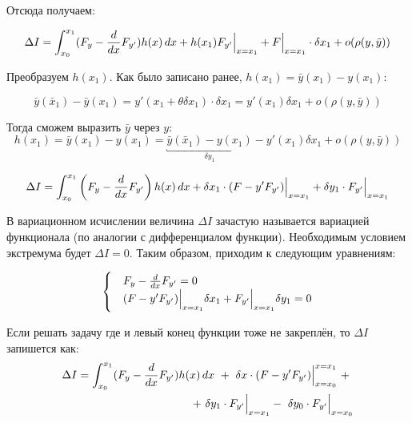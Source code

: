 \documentclass[12pt]{article}
\begin{document}

			Отсюда получаем:

			$$\Delta I = \int_{x_0}^{x_1} (F_y - \frac{d}{dx} F_{y'})h(x)\,dx + h(x_1)F_{y'}\Big|_{x=x_1}^{} + 
	  		F\Big|_{x=x_1}^{}\cdot \delta x_1 + o(\rho(y,\tilde{y}))$$

			Преобразуем $h(x_1)$. Как было записано ранее, $h(x_1) = \bar{y}(x_1) - y(x_1)$:

			$$\bar{y}(\bar{x}_1) - \bar{y}(x_1) = y'(x_1 + \theta \delta x_1)\cdot \delta x_1 
			= y'(x_1) \delta x_1 + o(\rho(y, \bar{y}))$$

			Тогда сможем выразить $\bar{y}$ через $y$:
			$$h(x_1) = \bar{y}(x_1) - y(x_1) = \underbracket{\bar{y}(\bar{x}_1) - y(x_1)}_{\delta y_1}
	  		- y'(x_1)\delta x_1 + o(\rho(y, \bar{y}))$$

			\begin{align*}
				\Delta I = \int_{x_0}^{x_1} \left(F_y - \frac{d}{dx}F_{y'}\right)h(x)\,dx
				+ \delta x_1\cdot(F - y'F_{y'}) \Big|_{x=x_1}^{}
				+ \delta y_1 \cdot F_{y'}\Big|_{x=x_1}^{}
			\end{align*}

			В вариационном исчислении величина $\Delta I$ зачастую называется вариацией функционала (по
			аналогии с дифференциалом функции). Необходимым условием экстремума будет $\Delta I = 0$. Таким
			образом, приходим к следующим уравнениям:

			\begin{equation}
				\label{eq:preTraversal}
				\begin{cases}
				&F_y - \frac{d}{dx} F_{y'} = 0 \\
				&(F - y'F_{y'})\Big|_{x = x_1}^{} \delta x_1 + F_{y'} \Big|_{x=x_1}^{}\delta y_1 = 0
				\end{cases} 
			\end{equation}

			 Если решать задачу где и левый конец функции тоже не закреплён, то
			$\Delta I$ запишется как:
			\begin{align*}
				\Delta I = \int_{x_0}^{x_1} (F_y - \frac{d}{dx}F_{y'})h(x)\,dx~+~ 
				\delta x\cdot(F - y'F_{y'})\Big|_{x = x_0}^{x = x_1}~+~ \\
				~+~\delta y_1 \cdot F_{y'} \Big|_{x=x_1}^{}-~\delta y_0 \cdot F_{y'} \Big|_{x=x_0}^{}
			\end{align*}

\end{document}
